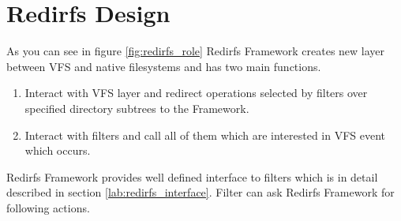 \section{Redirfs Design}
As you can see in figure \ref{fig:redirfs_role} Redirfs Framework creates new layer
between VFS and native filesystems and has two main functions.

\begin{enumerate}
	\item Interact with VFS layer and redirect operations selected by filters over
		specified directory subtrees to the Framework.
	\item Interact with filters and call all of them which are interested in VFS
		event which occurs.
\end{enumerate}

Redirfs Framework provides well defined interface to filters which is in detail
described in section \ref{lab:redirfs_interface}. Filter can ask Redirfs Framework for
following actions.

